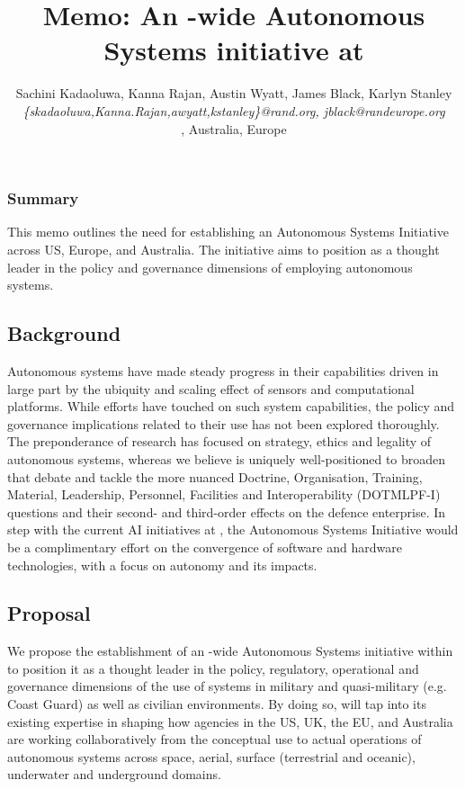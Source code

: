 \documentclass[11pt,letterpaper]{article}
\title{Memo: An \auke-wide Autonomous Systems initiative at \org}
\author{\textsf{\large{Sachini Kadaoluwa, Kanna Rajan, Austin Wyatt,
      James Black, Karlyn Stanley}}\\
  \emph{\{skadaoluwa,Kanna.Rajan,awyatt,kstanley\}@rand.org, jblack@randeurope.org}\\
  \orge, \org Australia, \org Europe
  }
\begin{document}
\maketitle{}

\subsubsection{Summary}

This memo outlines the need for establishing an Autonomous Systems
Initiative across \org US, Europe, and Australia. The initiative aims
to position \org as a thought leader in the policy and governance
dimensions of employing autonomous systems.

\subsection{Background}

Autonomous systems have made steady progress in their capabilities
driven in large part by the ubiquity and scaling effect of sensors and
computational platforms. While \org efforts have touched on such
system capabilities, the policy and governance implications related to
their use has not been explored thoroughly. The preponderance of
research has focused on strategy, ethics and legality of autonomous
systems, whereas we believe \org is uniquely well-positioned to
broaden that debate and tackle the more nuanced Doctrine,
Organisation, Training, Material, Leadership, Personnel, Facilities
and Interoperability (DOTMLPF-I) questions and their second- and
third-order effects on the defence enterprise. In step with the
current AI initiatives at \org, the Autonomous Systems Initiative
would be a complimentary effort on the convergence of software and
hardware technologies, with a focus on autonomy and its impacts.


\subsection{Proposal}

We propose the establishment of an \auke-wide Autonomous Systems
initiative within \org to position it as a thought leader in the
policy, regulatory, operational and governance dimensions of the use
of systems in military and quasi-military (e.g. Coast Guard) as well
as civilian environments. By doing so, \org will tap into its existing
expertise in shaping how agencies in the US, UK, the EU, and Australia
are working collaboratively from the conceptual use to actual
operations of autonomous systems across space, aerial, surface
(terrestrial and oceanic), underwater and underground domains.
\end{document}
